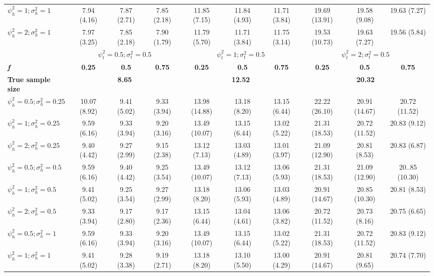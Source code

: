 \documentclass[AMA,STIX1COL,]{WileyNJD-v2}
\begin{document}
\begin{table}[ht]
{\begin{tabular}{l c c c c c c c c c}
$\psi_h^2 = 1; \sigma_h^2 = 1$ & 7.94 (4.16) & 7.87 (2.71) & 7.85 (2.18) & 11.85 (7.15) & 11.84 (4.93) & 11.71 (3.84) & 19.69 (13.91) & 19.58 (9.08) & 19.63 (7.27) \\
$\psi_h^2 = 2; \sigma_h^2 = 1$ & 7.97 (3.25) & 7.85 (2.18) & 7.90 (1.79) & 11.79 (5.70) & 11.71 (3.84) & 11.75 (3.14) & 19.53 (10.73) & 19.63 (7.27) & 19.56 (5.84) \\
\hline 
 & \multicolumn{3}{c}{$\psi_t^2 = 0.5; \sigma_t^2 = 0.5$} & \multicolumn{3}{c}{$\psi_t^2 = 1; \sigma_t^2 = 0.5$} & \multicolumn{3}{c}{$\psi_t^2= 2; \sigma_t^2 = 0.5$} \\
\addlinespace[1pt]
\cmidrule(lr){2-4} \cmidrule(lr){5-7} \cmidrule(lr){8-10}
\textbf{\textit{f}} & \textbf{0.25} & \textbf{0.5} & \textbf{0.75} & \textbf{0.25} & \textbf{0.5} & \textbf{0.75} & \textbf{0.25} & \textbf{0.5} & \textbf{0.75} \\
\hline
\textbf{True sample size} & \multicolumn{3}{c}{\textbf{8.65}} & \multicolumn{3}{c}{\textbf{12.52}} & \multicolumn{3}{c}{\textbf{20.32}} \\
$\psi_h^2 = 0.5; \sigma_h^2 = 0.25$ & 10.07 (8.92) & 9.41 (5.02) & 9.33 (3.94) & 13.98 (14.88) & 13.18 (8.20) & 13.15 (6.44) & 22.22 (26.10) & 20.91 (14.67) & 20.72 (11.52) \\
$\psi_h^2 = 1; \sigma_h^2 = 0.25$ & 9.59 (6.16) & 9.33 (3.94) & 9.20 (3.16) & 13.49 (10.07) & 13.15 (6.44) & 13.02 (5.22) & 21.31 (18.53) & 20.72 (11.52) & 20.83 (9.12) \\
$\psi_h^2 = 2; \sigma_h^2 = 0.25$ & 9.40 (4.42) & 9.27 (2.99) & 9.15 (2.38) & 13.12 (7.13) & 13.03 (4.89) & 13.01 (3.97) & 21.09 (12.90) & 20.81 (8.53) & 20.83 (6.87) \\
$\psi_h^2 = 0.5; \sigma_h^2 = 0.5$ & 9.59 (6.16) & 9.40 (4.42) & 9.25 (3.54) & 13.49 (10.07) & 13.12 (7.13) & 13.06 (5.93) & 21.31 (18.53) & 21.09 (12.90) & 20..85 (10.30) \\
$\psi_h^2 = 1; \sigma_h^2 = 0.5$ & 9.41 (5.02) & 9.25 (3.54) & 9.27 (2.99) & 13.18 (8.20) & 13.06 (5.93) & 13.03 (4.89) & 20.91 (14.67) & 20.85 (10.30) & 20.81 (8.53) \\
$\psi_h^2 = 2; \sigma_h^2 = 0.5$ & 9.33 (3.94) & 9.17 (2.80) & 9.17 (2.36) & 13.15 (6.44) & 13.04 (4.61) & 13.06 (3.82) & 20.72 (11.52) & 20.73 (8.16) & 20.75 (6.65) \\
$\psi_h^2 = 0.5; \sigma_h^2 = 1$ & 9.59 (6.16) & 9.33 (3.94) & 9.20 (3.16) & 13.49 (10.07) & 13.15 (6.44) & 13.02 (5.22) & 21.31 (18.53) &  20.72 (11.52) & 20.83 (9.12) \\
$\psi_h^2 = 1; \sigma_h^2 = 1$ & 9.41 (5.02) & 9.28 (3.38) & 9.19 (2.71) & 13.18 (8.20) & 13.10 (5.50) & 13.00 (4.29) & 20.91 (14.67) & 20.81 (9.65) & 20.74 (7.70) \\

\end{tabular}}
\end{table}
\end{document}
